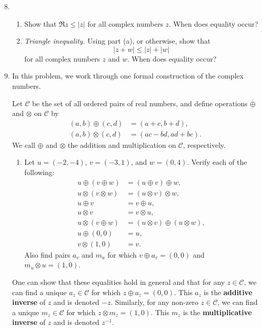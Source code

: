 \begin{enumerate}\setcounter{enumi}{7}
\item \begin{enumerate}
\item Show that $\Re z\leq\lvert z\rvert$ for all complex numbers $z$. When does equality occur?
\item \emph{Triangle inequality.} Using part (a), or otherwise, show that
\begin{equation*}
\lvert z + w\rvert\leq\lvert z\rvert + \lvert w\rvert
\end{equation*}
for all complex numbers $z$ and $w$. When does equality occur?
\end{enumerate}
\item In this problem, we work through one formal construction of the complex numbers.\par 
Let $\mathcal{C}$ be the set of all ordered pairs of real numbers, and define operations $\oplus$ and $\otimes$ on $\mathcal{C}$ by
\begin{align*}
(a,b)\oplus (c,d) &= (a + c, b + d), \\
(a,b)\otimes (c,d) &= (ac - bd, ad + bc).
\end{align*}
We call $\oplus$ and $\otimes$ the addition and multiplication on $\mathcal{C}$, respectively.
\begin{enumerate}
\item Let $u = (-2,-4)$, $v = (-3,1)$, and $w = (0,4)$. Verify each of the following:
\begin{align*}
u\oplus (v\oplus w) &= (u\oplus v)\oplus w, \\
u\otimes (v\otimes w) &= (u\otimes v)\otimes w, \\
u\oplus v &= v\oplus u, \\
u\otimes v &= v\otimes u, \\
u\otimes (v\oplus w) &= (u\otimes v)\oplus (u\otimes w), \\
u\oplus (0,0) &= u, \\
v\otimes (1,0) &= v.
\end{align*}
Also find pairs $a_v$ and $m_u$ for which $v\oplus a_v = (0,0)$ and $m_u\otimes u = (1,0)$.
\end{enumerate}
One can show that these equalities hold in general and that for any $z\in\mathcal{C}$, we can find a unique $a_z\in\mathcal{C}$ for which $z\oplus a_z = (0,0)$. This $a_z$ is the \textbf{additive inverse} of $z$ and is denoted $-z$. Similarly, for any non-zero $z\in\mathcal{C}$, we can find a unique $m_z\in\mathcal{C}$ for which $z\otimes m_z = (1,0)$. This $m_z$ is the \textbf{multiplicative inverse} of $z$ and is denoted $z^{-1}$.\par

\end{enumerate}
